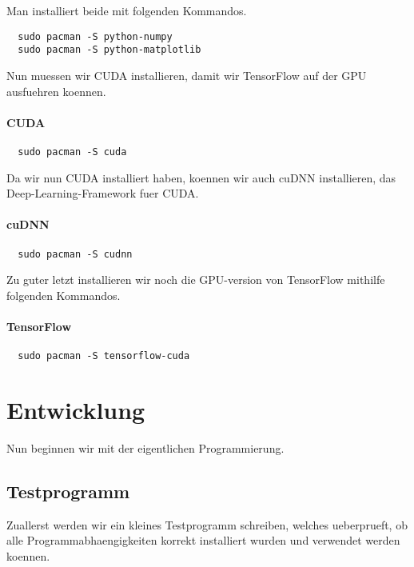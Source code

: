 Man installiert beide mit folgenden Kommandos.
\begin{verbatim}
  sudo pacman -S python-numpy
  sudo pacman -S python-matplotlib
\end{verbatim}

Nun muessen wir CUDA installieren, damit wir TensorFlow auf der GPU ausfuehren koennen.
\paragraph{CUDA}
\begin{verbatim}
  sudo pacman -S cuda
\end{verbatim}

Da wir nun CUDA installiert haben, koennen wir auch cuDNN installieren, das
Deep-Learning-Framework fuer CUDA.
\paragraph{cuDNN}
\begin{verbatim}
  sudo pacman -S cudnn
\end{verbatim}

Zu guter letzt installieren wir noch die GPU-version von TensorFlow mithilfe
folgenden Kommandos.
\paragraph{TensorFlow}
\begin{verbatim}
  sudo pacman -S tensorflow-cuda
\end{verbatim}


\section{Entwicklung}
Nun beginnen wir mit der eigentlichen Programmierung.

\subsection{Testprogramm}
Zuallerst werden wir ein kleines Testprogramm schreiben, welches ueberprueft, ob
alle Programmabhaengigkeiten korrekt installiert wurden und verwendet werden koennen.

